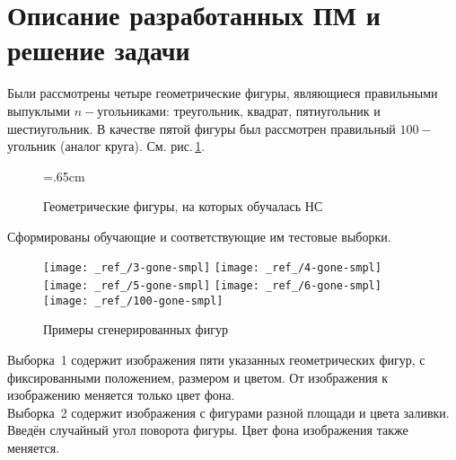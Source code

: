 \documentclass[12pt,a4paper]{article}
\begin{document}
\section{Описание разработанных ПМ и решение задачи}
Были рассмотрены четыре геометрические фигуры, являющиеся правильными выпуклыми $n-$угольниками: треугольник, квадрат, пятиугольник и шестиугольник. В качестве пятой фигуры был рассмотрен правильный 
$100-$угольник (аналог круга). См. рис.\,\ref{fig:02}.\\



\begin{figure}[tbh!]
	\center
	\newdimen\R
	\R=.65cm
	\caption{Геометрические фигуры, на которых обучалась НС}
	\label{fig:02}
\end{figure}

\noindent
Сформированы обучающие и соответствующие им тестовые выборки.\\[6pt]

\begin{figure}[tbh!]
	\centering
	\texttt{[image: \_ref\_/3-gone-smpl]}	
	\texttt{[image: \_ref\_/4-gone-smpl]}
	\texttt{[image: \_ref\_/5-gone-smpl]}	
	\texttt{[image: \_ref\_/6-gone-smpl]}	
	\texttt{[image: \_ref\_/100-gone-smpl]}						
	\caption{Примеры сгенерированных фигур}
	\label{fig:03}
\end{figure}

\noindent
Выборка \textnumero\,1 содержит изображения пяти указанных геометрических фигур, с фиксированными положением, размером и цветом. 
От изображения к изображению меняется только цвет фона.\\[6pt]
\noindent
Выборка \textnumero\,2 содержит изображения с фигурами разной площади 
и цвета заливки. Введён случайный угол поворота фигуры. 
Цвет фона изображения также меняется.\\[6pt]
\end{document}
